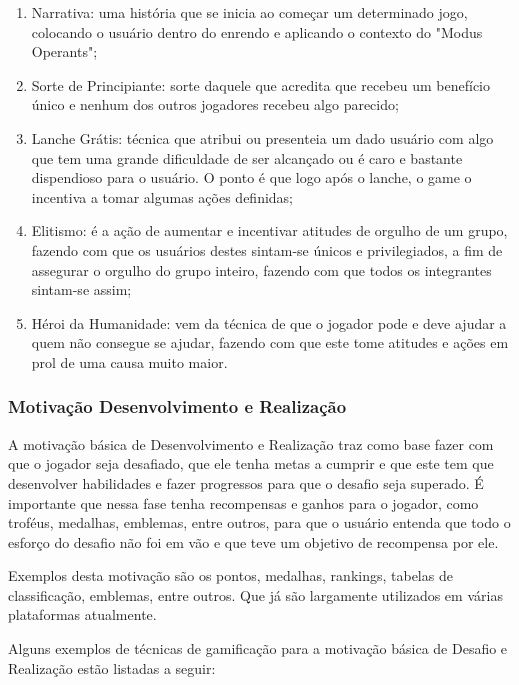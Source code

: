 \begin{enumerate}
    \item Narrativa: uma história que se inicia ao começar um determinado
        jogo, colocando o usuário dentro do enrendo e aplicando o contexto
        do "Modus Operants";
    \item Sorte de Principiante: sorte daquele que acredita que recebeu
        um benefício único e nenhum dos outros jogadores recebeu algo
        parecido;
    \item Lanche Grátis: técnica que atribui ou presenteia um dado usuário
        com algo que tem uma grande dificuldade de ser alcançado ou é
        caro e bastante dispendioso para o usuário.
        O ponto é que logo após o lanche, o game o incentiva a tomar
        algumas ações definidas;
    \item Elitismo: é a ação de aumentar e incentivar atitudes de orgulho
        de um grupo, fazendo com que os usuários destes sintam-se
        únicos e privilegiados, a fim de assegurar o orgulho do
        grupo inteiro, fazendo com que todos os integrantes sintam-se assim;
    \item Héroi da Humanidade: vem da técnica de que o jogador pode e deve
        ajudar a quem não consegue se ajudar, fazendo com que este tome
        atitudes e ações em prol de uma causa muito maior.
\end{enumerate}

\subsubsection{Motivação Desenvolvimento e Realização}
\label{sub:desenvolvimentoerealizacao}
A motivação básica de Desenvolvimento e Realização traz como base fazer
com que o jogador seja desafiado, que ele tenha metas a cumprir e que este
tem que desenvolver habilidades e fazer progressos para que o desafio
seja superado. É importante que nessa fase tenha recompensas e ganhos para
o jogador, como troféus, medalhas, emblemas, entre outros, para que o
usuário entenda que todo o esforço do desafio não foi em vão e que
teve um objetivo de recompensa por ele.

Exemplos desta motivação são os pontos, medalhas, rankings, tabelas de
classificação, emblemas, entre outros. Que já são largamente utilizados
em várias plataformas atualmente.

Alguns exemplos de técnicas de gamificação para a motivação básica
de Desafio e Realização estão listadas a seguir:


